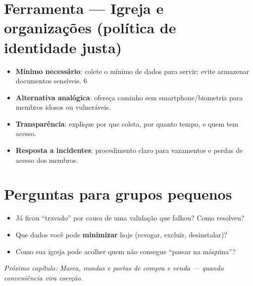 \section{Ferramenta --- Igreja e organizações (política de identidade justa)}
\begin{checklist}[title={Princípios para líderes}]
\begin{itemize}[leftmargin=*,noitemsep]
  \item \textbf{Mínimo necessário}: colete o mínimo de dados para servir; evite armazenar documentos sensíveis.
  6
  \item \textbf{Alternativa analógica}: ofereça caminho sem smartphone/biometria para membros idosos ou vulneráveis.
  \item \textbf{Transparência}: explique por que coleta, por quanto tempo, e quem tem acesso.
  \item \textbf{Resposta a incidentes}: procedimento claro para vazamentos e perdas de acesso dos membros.
\end{itemize}
\end{checklist}

\section{Perguntas para grupos pequenos}
\begin{itemize}[leftmargin=*,noitemsep]
  \item Já ficou ``travado'' por causa de uma validação que falhou? Como resolveu?
  \item Que dados você pode \textbf{minimizar} hoje (revogar, excluir, desinstalar)?
  \item Como sua igreja pode acolher quem não consegue ``passar na máquina''?
\end{itemize}

\bigskip
\noindent\textit{Próximo capítulo: Marca, moedas e portas de compra e venda --- quando conveniência vira coerção.}

